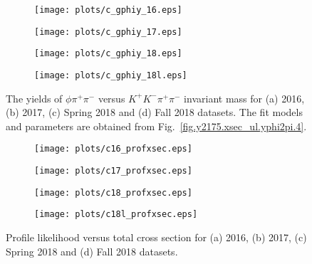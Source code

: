 \begin{center}
\null
\vfill
\begin{figure}[htbp]
    \centering
    \begin{subfigure}[b]{0.49\textwidth}
        \texttt{[image: plots/c\_gphiy\_16.eps]}
        \caption{}
        \label{fig.y2175.xsec_ul.yphi2pi.5.a}
    \end{subfigure}
    \begin{subfigure}[b]{0.49\textwidth}
        \texttt{[image: plots/c\_gphiy\_17.eps]}
        \caption{}
        \label{fig.y2175.xsec_ul.yphi2pi.5.b}
    \end{subfigure}
    \begin{subfigure}[b]{0.49\textwidth}
        \texttt{[image: plots/c\_gphiy\_18.eps]}
        \caption{}
        \label{fig.y2175.xsec_ul.yphi2pi.5.c}
    \end{subfigure}
    \begin{subfigure}[b]{0.49\textwidth}
        \texttt{[image: plots/c\_gphiy\_18l.eps]}
        \caption{}
        \label{fig.y2175.xsec_ul.yphi2pi.5.d}
    \end{subfigure}
    \caption{The yields of $\phi \pi^+ \pi^-$ versus $K^{+}K^{-} \pi^+ \pi^-$ invariant mass for (a) 2016, (b) 2017, (c) Spring 2018 and (d) Fall 2018 datasets. The fit models and parameters are obtained from Fig.~\ref{fig.y2175.xsec_ul.yphi2pi.4}.}
    \label{fig.y2175.xsec_ul.yphi2pi.5}
\end{figure}
\null
\vfill
\end{center}

\begin{center}
\null
\vfill
\begin{figure}[htbp]
    \centering
    \begin{subfigure}[b]{0.49\textwidth}
        \texttt{[image: plots/c16\_profxsec.eps]}
        \caption{}
        \label{fig.y2175.xsec_ul.yphi2pi.6.a}
    \end{subfigure}
    \begin{subfigure}[b]{0.49\textwidth}
        \texttt{[image: plots/c17\_profxsec.eps]}
        \caption{}
        \label{fig.y2175.xsec_ul.yphi2pi.6.b}
    \end{subfigure}
    \begin{subfigure}[b]{0.49\textwidth}
        \texttt{[image: plots/c18\_profxsec.eps]}
        \caption{}
        \label{fig.y2175.xsec_ul.yphi2pi.6.c}
    \end{subfigure}
    \begin{subfigure}[b]{0.49\textwidth}
        \texttt{[image: plots/c18l\_profxsec.eps]}
        \caption{}
        \label{fig.y2175.xsec_ul.yphi2pi.6.d}
    \end{subfigure}
    \caption{Profile likelihood versus total cross section for (a) 2016, (b) 2017, (c) Spring 2018 and (d) Fall 2018 datasets.}
    \label{fig.y2175.xsec_ul.yphi2pi.6}
\end{figure}
\null
\vfill
\end{center}

